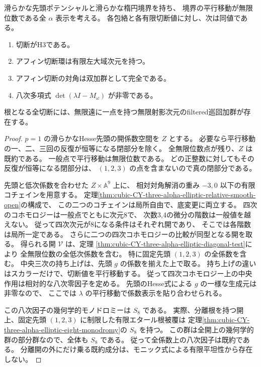 \begin{theorem}\label{thm:cubic-CY-three-alpha-elliptic-diagonal-all-nontorsion}
滑らかな先頭ポテンシャルと滑らかな楕円境界を持ち、
境界の平行移動が無限位数である全 $\alpha$ 表示を考える。
各包絡と各有限切断値に対し、次は同値である。
\begin{enumerate}
\item 切断がH3である。
\item アフィン切断環は有限左大域次元を持つ。
\item アフィン切断の対角は双加群として完全である。
\item 八次多項式 $\det(\lambda I-M_\omega)$ が非零である。
\end{enumerate}
根となる全切断には、無限遠に一点を持つ無限射影次元のfiltered巡回加群が存在する。
\end{theorem}
\begin{proof}
$p=1$ の滑らかなHesse先頭の開係数空間を $Z$ とする。
必要なら平行移動の一、二、三回の反復が恒等になる閉部分を除く。
全無限位数点が残り、$Z$ は既約である。
一般点で平行移動は無限位数である。
どの正整数に対してもその反復が恒等になる閉部分は、
$(1,2,3)$ の点を含まないので真の閉部分である。

先頭と低次係数を合わせた $Z\times\mathbb A^9$ 上に、
相対対角解消の重み $-3,0$ 以下の有限コチェインを用意する。
定理\ref{thm:cubic-CY-three-alpha-elliptic-relative-smooth-open}の構成で、
この二つのコチェインは局所自由で、底変更に両立する。
四次のコホモロジーは一般点でともに次元8で、
次数3,4の微分の階数は一般値を越えない。
従って四次次元が8になる条件はそれぞれ開であり、
そこでは各階数は局所一定である。
さらに二つの四次コホモロジーの比較が同型となる開を取る。
得られる開 $\mathcal V$ は、定理
\ref{thm:cubic-CY-three-alpha-elliptic-diagonal-test}により
全無限位数の全低次係数を含む。
特に固定先頭 $(1,2,3)$ の全係数を含む。
中央三次の持ち上げは、先頭 $g$ の係数を揃えた上で取る。
持ち上げの違いはスカラーだけで、切断値を平行移動する。
従って四次コホモロジー上の中央作用は相対的な八次零因子を定める。
先頭のHesse式による $g$ の一様な生成元は非零なので、
ここでは $\lambda$ の平行移動で係数表示を貼り合わせられる。

この八次因子の幾何学的モノドロミーは $S_8$ である。
実際、分離根を持つ開上、固定先頭 $(1,2,3)$ に制限した有限エタール根被覆は
定理\ref{thm:cubic-CY-three-alpha-elliptic-eight-monodromy}の $S_8$ を持つ。
この群は全開上の幾何学的群の部分群なので、全体も $S_8$ である。
従って全係数上の八次因子は既約である。
分離開の外にだけ乗る既約成分は、モニック式による有限平坦性から存在しない。


\end{proof}
